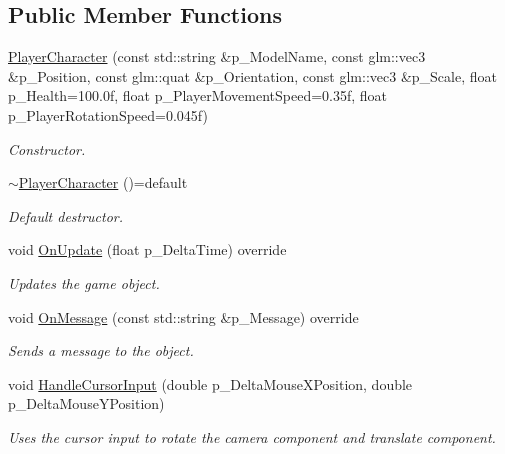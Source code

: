 \subsection*{Public Member Functions}
\begin{DoxyCompactItemize}
\item 
\mbox{\hyperlink{class_player_character_adfaef348eb262071e4dfb1965e9baa73}{Player\+Character}} (const std\+::string \&p\+\_\+\+Model\+Name, const glm\+::vec3 \&p\+\_\+\+Position, const glm\+::quat \&p\+\_\+\+Orientation, const glm\+::vec3 \&p\+\_\+\+Scale, float p\+\_\+\+Health=100.\+0f, float p\+\_\+\+Player\+Movement\+Speed=0.\+35f, float p\+\_\+\+Player\+Rotation\+Speed=0.\+045f)
\begin{DoxyCompactList}\small\item\em Constructor. \end{DoxyCompactList}\item 
\mbox{\label{class_player_character_ab6a5a717f24d001ff820dbf64ce77718}} 
\mbox{\hyperlink{class_player_character_ab6a5a717f24d001ff820dbf64ce77718}{$\sim$\+Player\+Character}} ()=default
\begin{DoxyCompactList}\small\item\em Default destructor. \end{DoxyCompactList}\item 
void \mbox{\hyperlink{class_player_character_a8b2f1ccb7f3ae744f9ecb9a80537e5ee}{On\+Update}} (float p\+\_\+\+Delta\+Time) override
\begin{DoxyCompactList}\small\item\em Updates the game object. \end{DoxyCompactList}\item 
void \mbox{\hyperlink{class_player_character_a7185322cbdc51cc339bfcada0c8fdb29}{On\+Message}} (const std\+::string \&p\+\_\+\+Message) override
\begin{DoxyCompactList}\small\item\em Sends a message to the object. \end{DoxyCompactList}\item 
void \mbox{\hyperlink{class_player_character_a6f60f1eec2f55e72a86ee5d1b1b3d361}{Handle\+Cursor\+Input}} (double p\+\_\+\+Delta\+Mouse\+X\+Position, double p\+\_\+\+Delta\+Mouse\+Y\+Position)
\begin{DoxyCompactList}\small\item\em Uses the cursor input to rotate the camera component and translate component. \end{DoxyCompactList}\item 

\end{DoxyCompactItemize}
